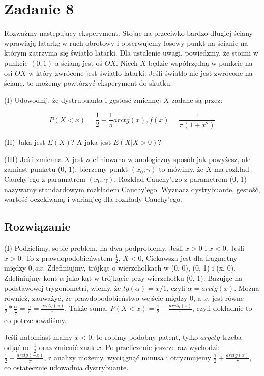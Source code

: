 \section{Zadanie 8}
Rozważmy następujący eksperyment. Stojąc na przeciwko bardzo długiej ściany wprawiają latarkę w ruch obrotowy i obserwujemy losowy punkt na ścianie na którym zatrzyma się światło latarki. Dla ustalenie uwagi, powiedzmy, że stoimi w punkcie \((0, 1)\) a ścianą jest oś \(OX\). Niech \(X\) będzie współrzędną w punkcie na osi \(OX\) w który zwrócone jest światło latarki. Jeśli światło nie jest zwrócone na ścianę. to możemy powtórzyć eksperyment do skutku.

(I) Udowodnij, że dystrubuanta i gęstość zmiennej \(X\) zadane są przez:

\[
	P(X < x) = \frac{1}{2} + \frac{1}{\pi} arctg(x), f(x) = \frac{1}{\pi(1+x^2)}
\]

(II) Jaka jest \(E(X)\)? A jaka jest \(E(X | X > 0)\)?

(III) Jeśli zmienna \(X\) jest zdefiniowana w anologiczny sposób jak powyżesz, ale zamiast punkctu (0, 1), bierzemy punkt \((x_0, \gamma)\) to mówimy, że \(X\) ma rozkład Cauchy'ego z paramatrem \((x_0, \gamma)\). Rozkład Cauchy'ego z parametrem (0, 1) nazywamy standardowym rozkładem Cauchy'ego.  Wyznacz dystrybuante, gestość, wartość oczekiwaną i warianjcę dla rozkłady Cauchy'ego.

\subsection*{Rozwiązanie}

(I) Podzielimy, sobie problem, na dwa podproblemy. Jeśli \(x > 0\) i \(x < 0\). Jeśli \(x>0\). To z prawdopodobieńwstem \(\frac{1}{2}\), \(X < 0\), Ciekawsza jest dla fragmetny między \(0, a x\). Zdefiniujmy, trójkąt o wierzchołkach w (0, 0), (0, 1) i (x, 0). Zdefiniujmy kont \(\alpha\) jako kąt w trójkącie przy wierzchołku (0, 1). Bazując na podstawowej trygonometri, wiemy, że \(tg(\alpha) = x/1\), czyli \(\alpha = arctg(x)\). Można również, zauważyć, że prawdopodobieństwo wejście między \(0\), a \(x\), jest równe \(\frac{1}{2} * \frac{\alpha}{\frac{\pi}{2}} = \frac{\alpha}{\pi} = \frac{arctg(x)}{\pi}\). Także suma, \(P(X < x) = \frac{1}{2} +  \frac{arctg(x)}{\pi}\), czyli dokładnie to co potrzebowaliśmy.

Jeśli natomiast mamy \(x < 0\), to robimy podobny patent, tylko \(argctg\) trzeba odjąć od \(\frac{1}{2}\) oraz zmienić znak \(x\). Po przeliczenie jeszcze raz wychodzi: \(\frac{1}{2} - \frac{arctg(-x)}{\pi}\), z analizy możemy, wyciągnąć minusa i otryzmujemy \(\frac{1}{2} + \frac{arctg(x)}{\pi}\), co ostatecznie udowadnia dystrybuante.

